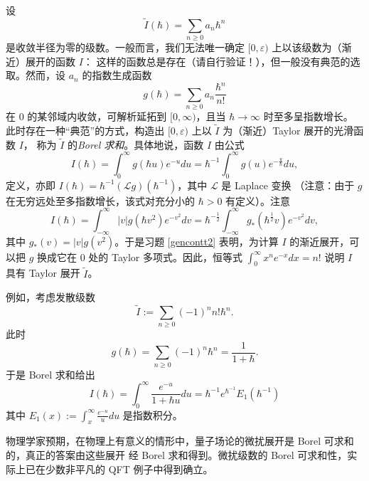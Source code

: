 设
$$
\widetilde I(\hbar)=\sum_{n\ge 0}a_n\hbar^n
$$ 
是收敛半径为零的级数。一般而言，我们无法唯一确定 $[0,\varepsilon)$ 上以该级数为（渐近）展开的函数 $I$：
这样的函数总是存在（请自行验证！），但一般没有典范的选取。然而，设 $a_n$ 的指数生成函数
$$
g(\hbar)=\sum_{n\ge 0}a_n\frac{\hbar^n}{n!}
$$ 
在 $0$ 的某邻域内收敛，可解析延拓到 $[0,\infty)$，且当 $\hbar\to \infty$ 时至多呈指数增长。
此时存在一种“典范”的方式，构造出 $[0,\varepsilon)$ 上以 $\widetilde I$ 为（渐近）Taylor 展开的光滑函数 $I$，
称为 $\widetilde I$ 的\emph{Borel 求和}。具体地说，函数 $I$ 由公式
$$
I(\hbar)=\int_0^\infty g(\hbar u)e^{-u}du=\hbar^{-1}\int_0^\infty g(u)e^{-\frac{u}{\hbar}}du,
$$
定义，亦即 $I(\hbar)=\hbar^{-1}(\mathcal Lg)(\hbar^{-1})$，其中 $\mathcal L$ 是 Laplace 变换
（注意：由于 $g$ 在无穷远处至多指数增长，该式对充分小的 $\hbar>0$ 有定义）。注意
$$
I(\hbar)=\int_{-\infty}^\infty |v|g(\hbar v^2)e^{-v^2}dv=\hbar^{-\frac{1}{2}}\int_{-\infty}^\infty g_*(\hbar^{\frac{1}{2}}v)e^{-v^2}dv,
$$
其中 $g_*(v)=|v|g(v^2)$。于是习题 \ref{gencontt2} 表明，为计算 $I$ 的渐近展开，可以把 $g$
换成它在 $0$ 处的 Taylor 多项式。因此，恒等式 $\int_0^\infty x^ne^{-x}dx=n!$ 说明
$I$ 具有 Taylor 展开 $\widetilde I$。

例如，考虑发散级数
$$
\widetilde I:=\sum_{n\ge  0}(-1)^nn!\hbar^n.
$$ 
此时
$$
g(\hbar)=
\sum_{n\ge
  0}(-1)^n\hbar^n=\frac{1}{1+\hbar}.
$$ 
于是 Borel 求和给出
$$
I(\hbar)=\int_0^\infty\frac{e^{-u}}{1+\hbar u}du=\hbar^{-1} e^{\hbar^{-1}}E_1(\hbar^{-1})
$$
其中 $E_1(x):=\int_{x}^\infty \frac{e^{-u}}{u}du$ 是指数积分。

物理学家预期，在物理上有意义的情形中，量子场论的微扰展开是 Borel 可求和的，真正的答案由这些展开
经 Borel 求和得到。微扰级数的 Borel 可求和性，实际上已在少数非平凡的 QFT 例子中得到确立。


